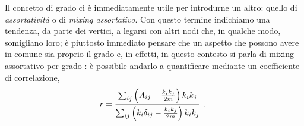 %
Il concetto di grado ci è immediatamente utile per introdurne un altro: quello di \emph{assortativit\`{a}} o di \emph{mixing assortativo}.
 Con questo termine indichiamo una tendenza, da parte dei vertici, a legarsi con altri nodi che, in qualche modo, somigliano loro; è piuttosto immediato pensare che un aspetto che possono avere in comune sia proprio il grado e, in effetti, in questo contesto si parla di mixing assortativo per grado \cite{Newman}: è possibile andarlo a quantificare mediante un coefficiente di correlazione,
\begin{equation}
	r = \frac{ \sum_{ij} \left( A_{ij} - \frac{k_i k_j}{2m} \right) k_i k_j}{\sum_{ij} \left(k_i \delta_{ij} - \frac{k_i k_j}{2m} \right) k_i k_j} $ . $
\end{equation}

